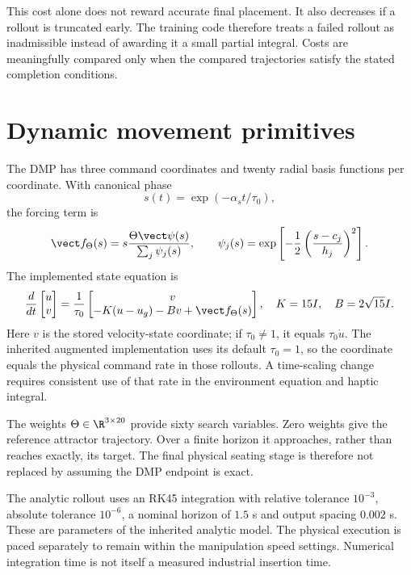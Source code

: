 This cost alone does not reward accurate final placement. It also decreases if a rollout is truncated early. The training code therefore treats a failed rollout as inadmissible instead of awarding it a small partial integral. Costs are meaningfully compared only when the compared trajectories satisfy the stated completion conditions.

\section{Dynamic movement primitives}
\label{sec:dmp}

The DMP has three command coordinates and twenty radial basis functions per coordinate. With canonical phase
\begin{equation}
s(t)=\exp(-\alpha_s t/\tau_0),
\end{equation}
the forcing term is
\begin{equation}
\vect f_{\Theta}(s)=s\frac{\Theta\vect\psi(s)}{\sum_j\psi_j(s)},\qquad
\psi_j(s)=\exp\left[-\frac12\left(\frac{s-c_j}{h_j}\right)^2\right].
\label{eq:dmp-forcing}
\end{equation}
The implemented state equation is
\begin{equation}
\frac{d}{dt}\begin{bmatrix}u\\v\end{bmatrix}
=\frac1{\tau_0}\begin{bmatrix}
v\\-K(u-u_g)-Bv+\vect f_{\Theta}(s)
\end{bmatrix},
\quad K=15I,\quad B=2\sqrt{15}I.
\label{eq:dmp-state}
\end{equation}
Here $v$ is the stored velocity-state coordinate; if $\tau_0\neq1$, it equals $\tau_0\dot u$. The inherited augmented implementation uses its default $\tau_0=1$, so the coordinate equals the physical command rate in those rollouts. A time-scaling change requires consistent use of that rate in the environment equation and haptic integral.

The weights $\Theta\in\R^{3\times20}$ provide sixty search variables. Zero weights give the reference attractor trajectory. Over a finite horizon it approaches, rather than reaches exactly, its target. The final physical seating stage is therefore not replaced by assuming the DMP endpoint is exact.

The analytic rollout uses an RK45 integration with relative tolerance $10^{-3}$, absolute tolerance $10^{-6}$, a nominal horizon of $1.5$ s and output spacing $0.002$ s. These are parameters of the inherited analytic model. The physical execution is paced separately to remain within the manipulation speed settings. Numerical integration time is not itself a measured industrial insertion time.

